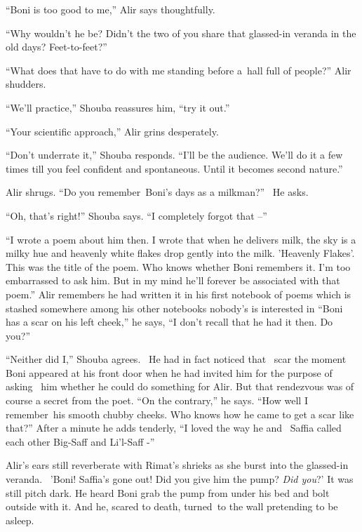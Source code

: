 \documentclass[twoside,11pt]{book}
\begin{document}
``Boni is too good to me,'' Alir says thoughtfully.

``Why wouldn't he be? Didn't the two of you share that glassed-in veranda in the old days?
Feet-to-feet?''

``What does that have to do with me standing before a~hall full of people?'' Alir shudders.

``We'll practice,'' Shouba reassures him, ``try it out.''

``Your scientific approach,'' Alir grins desperately.

``Don't underrate it,'' Shouba responds. ``I'll be the audience. We'll do it a
few times till you feel confident and spontaneous. Until it becomes second nature.''

Alir shrugs. ``Do you remember~Boni's days as a milkman?'' \ He asks.

``Oh, that's right!'' Shouba says. ``I completely forgot that --''

``I wrote a poem about him then. I wrote that when he delivers milk, the sky is a milky hue and heavenly
white flakes drop gently into the milk. 'Heavenly Flakes'. This was the title of the poem. Who knows whether Boni
remembers it. I'm too embarrassed to ask him. But in my mind he'll forever be associated with that poem.''
Alir remembers he had written it in his first notebook of poems which is stashed somewhere among his other notebooks
nobody's is interested in ``Boni has a scar on his left cheek,'' he says, ``I
don't recall that he had it then. Do you?'' \

``Neither did I,'' Shouba agrees. \ He had in fact noticed that \ scar the moment Boni
appeared at his front door when he had invited him for the purpose of asking \ him whether he could do something for
Alir. But that rendezvous was of course a secret from the poet. ``On the contrary,'' he says.
``How well I remember~his smooth chubby cheeks. Who knows how he came to get a scar like
that?'' After a minute he adds tenderly, ``I loved the way he and~ Saffia called each other
Big-Saff and Li'l-Saff -''

Alir's ears still reverberate with Rimat's shrieks as she burst into the glassed-in veranda. \ {}'Boni! Saffia's gone
out! Did you give him the pump? \textit{Did you}?' It was still pitch dark. He heard Boni grab the pump from under his
bed and bolt outside with it. And he, scared to death, turned~to the wall pretending to be asleep.

~

\chapter{}
\end{document}
